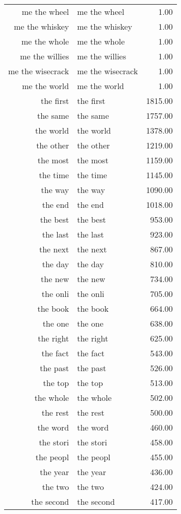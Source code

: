 \begin{table}[ht]
\begin{tabular}{rlr}
  me the wheel & me the wheel & 1.00 \\ 
  me the whiskey & me the whiskey & 1.00 \\ 
  me the whole & me the whole & 1.00 \\ 
  me the willies & me the willies & 1.00 \\ 
  me the wisecrack & me the wisecrack & 1.00 \\ 
  me the world & me the world & 1.00 \\ 
  the first & the first & 1815.00 \\ 
  the same & the same & 1757.00 \\ 
  the world & the world & 1378.00 \\ 
  the other & the other & 1219.00 \\ 
  the most & the most & 1159.00 \\ 
  the time & the time & 1145.00 \\ 
  the way & the way & 1090.00 \\ 
  the end & the end & 1018.00 \\ 
  the best & the best & 953.00 \\ 
  the last & the last & 923.00 \\ 
  the next & the next & 867.00 \\ 
  the day & the day & 810.00 \\ 
  the new & the new & 734.00 \\ 
  the onli & the onli & 705.00 \\ 
  the book & the book & 664.00 \\ 
  the one & the one & 638.00 \\ 
  the right & the right & 625.00 \\ 
  the fact & the fact & 543.00 \\ 
  the past & the past & 526.00 \\ 
  the top & the top & 513.00 \\ 
  the whole & the whole & 502.00 \\ 
  the rest & the rest & 500.00 \\ 
  the word & the word & 460.00 \\ 
  the stori & the stori & 458.00 \\ 
  the peopl & the peopl & 455.00 \\ 
  the year & the year & 436.00 \\ 
  the two & the two & 424.00 \\ 
  the second & the second & 417.00 \\ 

\end{tabular}
\end{table}
